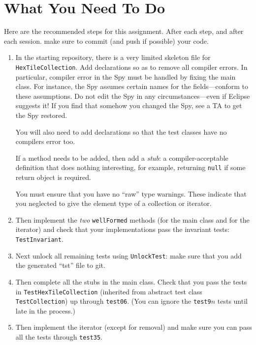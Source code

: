 \documentclass[11pt]{article}
\begin{document}
\section{What You Need To Do}

Here are the recommended steps for this assignment.  After each step,
and after each session.
make sure to commit (and push if possible) your code.
\begin{enumerate}
\item In the starting repository, there is a very limited skeleton
  file for \texttt{HexTileCollection}.  Add declarations so as to remove
  all compiler errors.  In particular, compiler error in the Spy
  must be handled by fixing the main class.  For instance, the Spy
  assumes certain names for the fields---conform to these
  assumptions.  Do not edit the Spy in
  any circumstances---even if Eclipse suggests it!  If you find that
  somehow you changed the Spy, see a TA to get the Spy restored.
  
  You will also need to add declarations so that the test
  classes have no compilers error too.
  
  If a method needs to be added, then add a \emph{stub}: a
  compiler-acceptable definition that does nothing interesting, for
  example, returning \texttt{null} if some return object is
  required.
  
  You must ensure that you have no ``raw'' type warnings.  These
  indicate that you neglected to give the element type of a
  collection or iterator.
  
\item
  Then implement the \emph{two} \texttt{wellFormed} methods (for the
  main class and for the iterator) and check that your
  implementations pass the invariant tests: \texttt{TestInvariant}.
  
\item
  Next unlock all remaining tests using \texttt{UnlockTest}: make
  sure that you add the generated ``tst'' file to \textsf{git}.
  
\item
  Then complete all the stubs in the main class.  Check that you
  pass the tests in \texttt{TestHexTileCollection} (inherited from
  abstract test class \texttt{TestCollection}) up through
  \texttt{test06}.  (You can ignore the \texttt{test9}$n$ tests until
  late in the process.)
  
\item
  Then implement the iterator (except for removal) and make sure you can pass all the
  tests through \texttt{test35}.
  

\end{enumerate}
\end{document}
